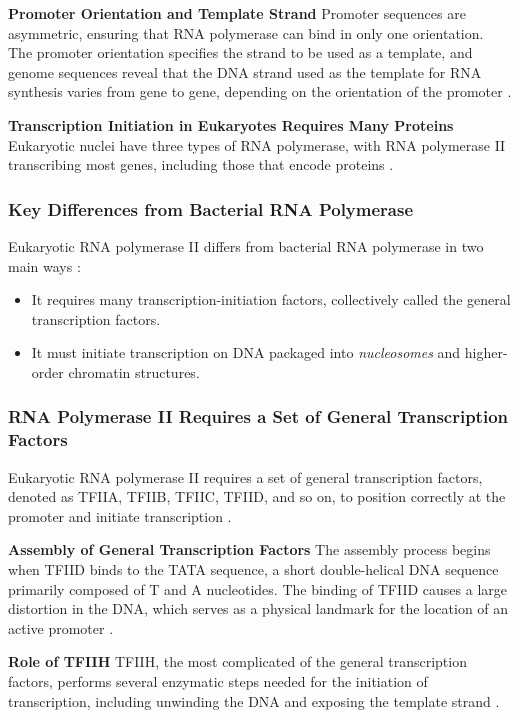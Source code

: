 \textbf{Promoter Orientation and Template Strand}
Promoter sequences are asymmetric, ensuring that RNA polymerase can bind in only one orientation. The promoter orientation specifies the strand to be used as a template, and genome sequences reveal that the DNA strand used as the template for RNA synthesis varies from gene to gene, depending on the orientation of the promoter \cite*{L1-Chapter6}.

\textbf{Transcription Initiation in Eukaryotes Requires Many Proteins}
Eukaryotic nuclei have three types of RNA polymerase, with RNA polymerase II transcribing most genes, including those that encode proteins \cite*{L1-Chapter6}.

\subsubsection*{Key Differences from Bacterial RNA Polymerase}
Eukaryotic RNA polymerase II differs from bacterial RNA polymerase in two main ways \cite*{L1-Chapter6}:
\begin{highlight}
    \begin{itemize}
        \item It requires many transcription-initiation factors, collectively called the general transcription factors.
        \item It must initiate transcription on DNA packaged into \textit{nucleosomes} and higher-order chromatin structures.
    \end{itemize}
\end{highlight}

\subsubsection*{RNA Polymerase II Requires a Set of General Transcription Factors}
Eukaryotic RNA polymerase II requires a set of general transcription factors, denoted as TFIIA, TFIIB, TFIIC, TFIID, and so on, to position correctly at the promoter and initiate transcription \cite*{L1-Chapter6}.

\textbf{Assembly of General Transcription Factors}
The assembly process begins when TFIID binds to the TATA sequence, a short double-helical DNA sequence primarily composed of T and A nucleotides. The binding of TFIID causes a large distortion in the DNA, which serves as a physical landmark for the location of an active promoter \cite*{L1-Chapter6}.

\textbf{Role of TFIIH}
TFIIH, the most complicated of the general transcription factors, performs several enzymatic steps needed for the initiation of transcription, including unwinding the DNA and exposing the template strand \cite*{L1-Chapter6}.

